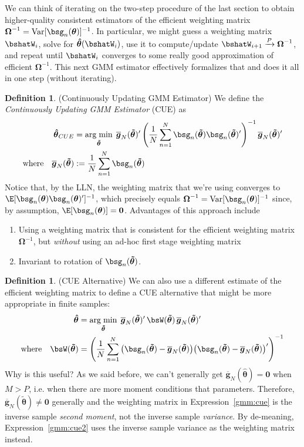 \documentclass[12pt]{article}
\theoremstyle{plain}
\theoremstyle{definition}
\newtheorem{defn}[thm]{Definition}
\theoremstyle{remark}
\newcommand{\bstheta}{\boldsymbol{\theta}}
\newcommand{\bsOmega}{\boldsymbol{\Omega}}
\newcommand{\bshattheta}{\boldsymbol{\hat{\theta}}}
\newcommand{\bstildetheta}{\boldsymbol{\tilde{\theta}}}
\newcommand{\bsbarg}{\boldsymbol{\overline{g}}}
\renewcommand{\bso}{\boldsymbol{0}}
\DeclareMathOperator*{\argmin}{arg\;min}
\newcommand{\Var}{\operatorname{Var}}
\newcommand{\pto}{\xrightarrow{P}}
\newcommand{\sumnN}{\sum^N_{n=1}}
\begin{document}
We can think of iterating on the two-step procedure of the last section
to obtain higher-quality consistent estimators of the efficient
weighting matrix $\bsOmega^{-1}=\Var[\bsg_n(\bstheta)]^{-1}$. In
particular, we might guess a weighting matrix $\bshatW_i$, solve for
$\bshattheta(\bshatW_i)$, use it to compute/update
$\bshatW_{i+1}\pto\bsOmega^{-1}$, and repeat until $\bshatW_i$ converges
to some really good approximation of efficient $\bsOmega^{-1}$. This
next GMM estimator effectively formalizes that and does it all in one
step (without iterating).

\begin{defn}(Continuously Updating GMM Estimator)
We define the \emph{Continuously Updating GMM Estimator} (CUE)
as
\begin{align}
  \bshattheta_{CUE}
  &=
  \argmin_{\bstildetheta}\;
  \bsbarg_N(\bstildetheta)'
  \left(
  \frac{1}{N}
  \sumnN
  \bsg_n(\bstildetheta)
  \bsg_n(\bstildetheta)'
  \right)^{-1}
  \bsbarg_N(\bstildetheta)'
  \label{gmm:cue}
  \\
  \text{where}\quad
  \bsbarg_N(\bstildetheta)
  &:= \frac{1}{N}\sumnN \bsg_n(\bstildetheta)
  \notag
\end{align}
Notice that, by the LLN, the weighting matrix that we're using converges
to $\E[\bsg_n(\bstheta)\bsg_n(\bstheta)']^{-1}$, which precisely equals
$\bsOmega^{-1}=\Var[\bsg_n(\bstheta)]^{-1}$ since,
by assumption, $\E[\bsg_n(\bstheta)]=\bso$.
Advantages of this approach include
\begin{enumerate}[label=(\roman*)]
  \item Using a weighting matrix that is consistent for the efficient
    weighting matrix $\bsOmega^{-1}$, but \emph{without} using an ad-hoc
    first stage weighting matrix
  \item Invariant to rotation of $\bsg_n(\bstildetheta)$.
\end{enumerate}
\end{defn}

\begin{defn}(CUE Alternative)
We can also use a different estimate of the efficient weighting matrix
to define a CUE alternative that might be more appropriate in finite
samples:
\begin{align}
  \bshattheta
  &=
  \argmin_{\bstildetheta}\;
  \bsbarg_N(\bstildetheta)'
  \,
  \bsW(\bstildetheta)
  \,
  \bsbarg_N(\bstildetheta)'
  \label{gmm:cue2}
  \\
  \text{where}\quad
  \bsW(\bstildetheta)
  &=
  \left(
  \frac{1}{N}
  \sumnN
  \big(
  \bsg_n(\bstildetheta)
  -
  \bsbarg_N(\bstildetheta)
  \big)
  \big(
  \bsg_n(\bstildetheta)
  -
  \bsbarg_N(\bstildetheta)
  \big)'
  \right)^{-1}
  \notag
\end{align}
Why is this useful?
As we said before, we can't generally get $\bsbarg_N(\bshattheta)=\bso$
when $M>P$, i.e. when there are more moment conditions that parameters.
Therefore, $\bsbarg_N(\bstildetheta)\neq\bso$ generally and the weighting
matrix in Expression~\ref{gmm:cue} is the inverse sample \emph{second
moment}, not the inverse sample \emph{variance}.
By de-meaning, Expression~\ref{gmm:cue2} uses the inverse sample
variance as the weighting matrix instead.
\end{defn}
\end{document}
